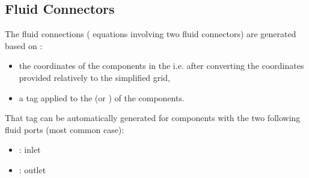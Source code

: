 \documentclass[letterpaper,10pt, openany,english]{sphinxmanual}
\begin{document}
\begin{sphinxVerbatim}[commandchars=\\\{\}]
                   
                   
                   
                   
                   
                   
                   
                   
      \PYG{p}{]}
\end{sphinxVerbatim}


\subsection{Fluid Connectors}
\label{\detokenize{requirements:fluid-connectors}}\label{\detokenize{requirements:par-fluid-connectors}}
The fluid connections ( equations involving two fluid connectors) are generated based on :
\begin{itemize}
\item {} 
the coordinates of the components in the  i.e. after converting the coordinates provided relatively to the simplified grid,

\item {} 
a tag applied to the  (or ) of the components.

\end{itemize}

That tag can be automatically generated for components with the two following fluid ports (most common case):
\begin{itemize}
\item {} 
: inlet

\item {} 
: outlet

\end{itemize}
\end{document}
